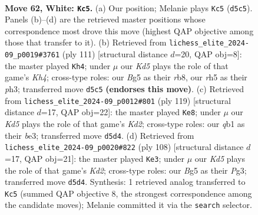 \documentclass[11pt]{article}
\begin{document}
\clearpage

\begin{figure}[p]\centering
\begin{subfigure}{0.46\textwidth}\centering
\resizebox{\linewidth}{!}{%
\newchessgame
\chessboard[
  setfen={8/3k4/3P4/1p1K2Br/8/r7/8/1q6 w - - 0 62},
  showmover=false,
  pgfstyle=straightmove, color=movearrow, markmove={d5-c5}
]}
\caption{}
\end{subfigure}\hfill
\begin{subfigure}{0.46\textwidth}\centering
\resizebox{\linewidth}{!}{%
\newchessgame
\chessboard[
  setfen={1R6/8/5p2/5K1k/8/1p5P/8/1r6 b - - 1 56},
  showmover=false,
  pgfstyle=straightmove, color=movearrow, markmove={h5-h4}
]}
\caption{}
\end{subfigure}
\\[4pt]
\begin{subfigure}{0.46\textwidth}\centering
\resizebox{\linewidth}{!}{%
\newchessgame
\chessboard[
  setfen={8/3kb2R/3p4/3K4/8/4B3/5P2/8 b - - 20 60},
  showmover=false,
  pgfstyle=straightmove, color=movearrow, markmove={d7-e8}
]}
\caption{}
\end{subfigure}\hfill
\begin{subfigure}{0.46\textwidth}\centering
\resizebox{\linewidth}{!}{%
\newchessgame
\chessboard[
  setfen={8/8/1P1k4/8/4p3/6P1/3KB1r1/8 w - - 0 55},
  showmover=false,
  pgfstyle=straightmove, color=movearrow, markmove={d2-e3}
]}
\caption{}
\end{subfigure}
\caption{\textbf{Move 62, White: \texttt{Kc5}.} (a) Our position; Melanie plays \texttt{Kc5} (\texttt{d5c5}). Panels (b)--(d) are the retrieved master positions whose correspondence most drove this move (highest QAP objective among those that transfer to it). (b) Retrieved from \texttt{lichess\_elite\_2024-09\_p0019\#3761} (ply 111) [structural distance $d$=20, QAP obj=8]: the master played \texttt{Kh4}; under $\mu$ our \emph{Kd5} plays the role of that game's \emph{Kh4}; cross-type roles: our \emph{B}g5 as their \emph{r}b8, our \emph{r}h5 as their \emph{p}h3; transferred move \texttt{d5c5} \textbf{(endorses this move)}. (c) Retrieved from \texttt{lichess\_elite\_2024-09\_p0012\#801} (ply 119) [structural distance $d$=17, QAP obj=22]: the master played \texttt{Ke8}; under $\mu$ our \emph{Kd5} plays the role of that game's \emph{Kd2}; cross-type roles: our \emph{q}b1 as their \emph{b}e3; transferred move \texttt{d5d4}. (d) Retrieved from \texttt{lichess\_elite\_2024-09\_p0020\#822} (ply 108) [structural distance $d$=17, QAP obj=21]: the master played \texttt{Ke3}; under $\mu$ our \emph{Kd5} plays the role of that game's \emph{Kd2}; cross-type roles: our \emph{B}g5 as their \emph{P}g3; transferred move \texttt{d5d4}. Synthesis: 1 retrieved analog transferred to \texttt{Kc5} (summed QAP objective 8, the strongest correspondence among the candidate moves); Melanie committed it via the \texttt{search} selector.}
\label{fig:thought-m122}
\end{figure}
\end{document}
